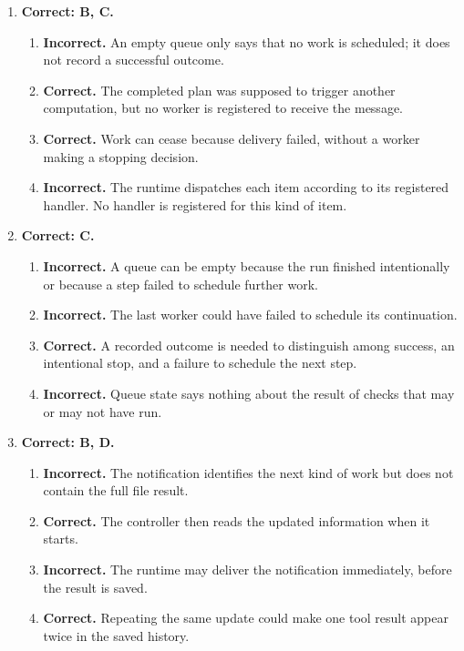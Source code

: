 \begin{enumerate}[start=41,itemsep=0.7\baselineskip]
\item[{\hyperref[exercise:43]{43.}}] \begin{minipage}[t]{\linewidth}
\textbf{Correct: B, C.}
\begin{enumerate}[label=\textnormal{(\Alph*)},leftmargin=*,itemsep=0pt]
\item \textbf{Incorrect.} An empty queue only says that no work is scheduled; it does not record a successful outcome.
\item \textbf{Correct.} The completed plan was supposed to trigger another computation, but no worker is registered to receive the message.
\item \textbf{Correct.} Work can cease because delivery failed, without a worker making a stopping decision.
\item \textbf{Incorrect.} The runtime dispatches each item according to its registered handler. No handler is registered for this kind of item.
\end{enumerate}
\end{minipage}

\item[{\hyperref[exercise:44]{44.}}] \begin{minipage}[t]{\linewidth}
\textbf{Correct: C.}
\begin{enumerate}[label=\textnormal{(\Alph*)},leftmargin=*,itemsep=0pt]
\item \textbf{Incorrect.} A queue can be empty because the run finished intentionally or because a step failed to schedule further work.
\item \textbf{Incorrect.} The last worker could have failed to schedule its continuation.
\item \textbf{Correct.} A recorded outcome is needed to distinguish among success, an intentional stop, and a failure to schedule the next step.
\item \textbf{Incorrect.} Queue state says nothing about the result of checks that may or may not have run.
\end{enumerate}
\end{minipage}

\item[{\hyperref[exercise:45]{45.}}] \begin{minipage}[t]{\linewidth}
\textbf{Correct: B, D.}
\begin{enumerate}[label=\textnormal{(\Alph*)},leftmargin=*,itemsep=0pt]
\item \textbf{Incorrect.} The notification identifies the next kind of work but does not contain the full file result.
\item \textbf{Correct.} The controller then reads the updated information when it starts.
\item \textbf{Incorrect.} The runtime may deliver the notification immediately, before the result is saved.
\item \textbf{Correct.} Repeating the same update could make one tool result appear twice in the saved history.
\end{enumerate}
\end{minipage}


\end{enumerate}
